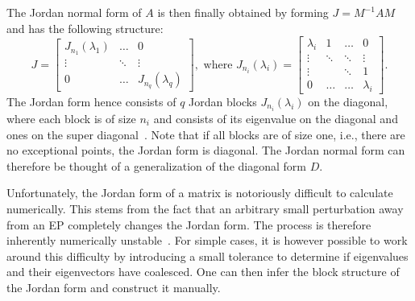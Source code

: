 \documentclass[../main.tex]{subfiles}
\begin{document}
The Jordan normal form of $A$ is then finally obtained by forming $J = M^{-1}AM$ and has the following structure: 
\begin{equation}\label{eq:jordan}
    J = \begin{bmatrix}J_{n_1}(\lambda_1) & \dots & 0 \\
                            \vdots & \ddots & \vdots \\
                        0 & \dots &  J_{n_q}(\lambda_q)\end{bmatrix}, \text{ where }
       J_{n_i}(\lambda_i) = \begin{bmatrix} \lambda_i & 1 & \dots & 0 \\
                                                    \vdots  & \ddots & \ddots & \vdots \\
                                                    \vdots & & \ddots& 1 \\
                                                    0 & \dots & \dots & \lambda_i\end{bmatrix}.
\end{equation}
The Jordan form hence consists of $q$ Jordan blocks $J_{n_i}(\lambda_i)$ on the diagonal, where each block is of size $n_i$ and consists of its eigenvalue on the diagonal and ones on the super diagonal~\cite{uffe}. Note that if all blocks are of size one, i.e., there are no exceptional points, the Jordan form is diagonal. The Jordan normal form can therefore be thought of a generalization of the diagonal form $D$.


Unfortunately, the Jordan form of a matrix is notoriously difficult to calculate numerically. This stems from the fact that an arbitrary small perturbation away from an EP completely changes the Jordan form. The process is therefore inherently numerically unstable~\cite{horn}. For simple cases, it is however possible to work around this difficulty by introducing a small tolerance to determine if eigenvalues and their eigenvectors have coalesced. One can then infer the block structure of the Jordan form and construct it manually.
\end{document}

